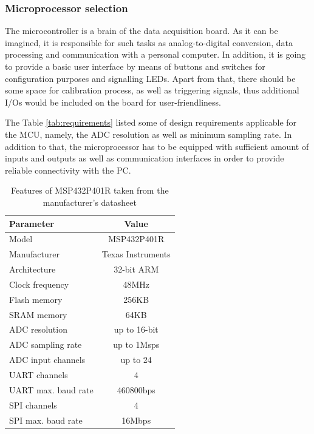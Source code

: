 \documentclass[12pt,a4paper]{article}
\begin{document}
\subsubsection{Microprocessor selection}
The microcontroller is a brain of the data acquisition board. As it can be imagined, it is responsible for such tasks as analog-to-digital conversion, data processing and communication with a personal computer. In addition, it is going to provide a basic user interface by means of buttons and switches for configuration purposes and signalling LEDs. Apart from that, there should be some space for calibration process, as well as triggering signals, thus additional I/Os would be included on the board for user-friendliness.
\par

The Table \ref{tab:requirements} listed some of design requirements applicable for the MCU, namely, the ADC resolution as well as minimum sampling rate. In addition to that, the microprocessor has to be equipped with sufficient amount of inputs and outputs as well as communication interfaces in order to provide reliable connectivity with the PC.

\begin{table}[ht!]
\begin{tabular}{|l|c|}
\hline
\textbf{Parameter}	& \textbf{Value} 	\\ \hline
Model  				& MSP432P401R       \\ \hline
Manufacturer    	& Texas Instruments	\\ \hline
Architecture       	&  32-bit ARM 		\\ \hline
Clock frequency     &  48MHz			\\ \hline
Flash memory        &  256KB			\\ \hline
SRAM memory         &  64KB				\\ \hline
ADC resolution 		&  up to 16-bit		\\ \hline
ADC sampling rate 	&  up to 1Msps 		\\ \hline
ADC input channels 	&  up to 24  		\\ \hline
UART channels 		&  4 				\\ \hline
UART max. baud rate &  460800bps 		\\ \hline
SPI channels 		&  4 				\\ \hline
SPI max. baud rate &  16Mbps 			\\ \hline
\end{tabular}
\caption{Features of MSP432P401R taken from the manufacturer's datasheet \cite{msp432_params}}
\label{tab:MSP432_params}
\end{table}
\end{document}
